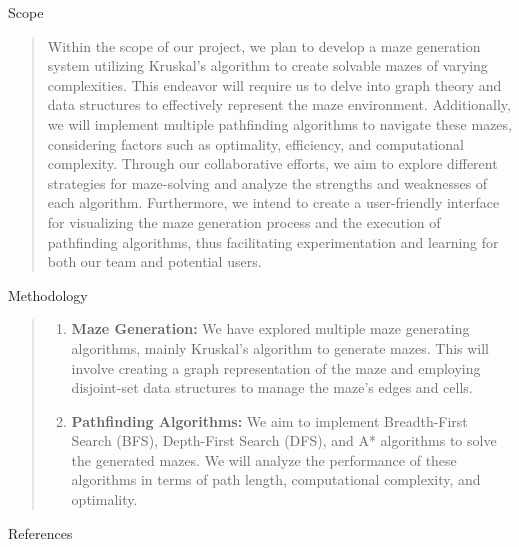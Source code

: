 \documentclass{amsart}
\begin{document}
\begin{section}{Scope}
    \begin{quote}
        Within the scope of our project, we plan to develop a maze generation system utilizing Kruskal's algorithm to create solvable mazes of varying complexities. This endeavor will require us to delve into graph theory and data structures to effectively represent the maze environment. Additionally, we will implement multiple pathfinding algorithms to navigate these mazes, considering factors such as optimality, efficiency, and computational complexity. Through our collaborative efforts, we aim to explore different strategies for maze-solving and analyze the strengths and weaknesses of each algorithm. Furthermore, we intend to create a user-friendly interface for visualizing the maze generation process and the execution of pathfinding algorithms, thus facilitating experimentation and learning for both our team and potential users.
    \end{quote}
\end{section}

\begin{section}{Methodology}
    \begin{quote}
        \begin{enumerate}
            \item \textbf{Maze Generation:} We have explored multiple maze generating algorithms, mainly Kruskal's algorithm to generate mazes. This will involve creating a graph representation of the maze and employing disjoint-set data structures to manage the maze's edges and cells. 
            \item \textbf{Pathfinding Algorithms:} We aim to implement Breadth-First Search (BFS), Depth-First Search (DFS), and A* algorithms to solve the generated mazes. We will analyze the performance of these algorithms in terms of path length, computational complexity, and optimality.
        \end{enumerate}
    \end{quote}
\end{section}

\begin{section}{References}

    \begin{quote}
        \begin{enumerate}

        \end{enumerate}
    \end{quote}
    
\end{section}
\end{document}

